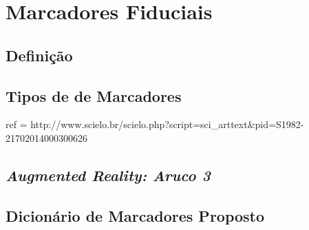 \chapter{Marcadores Fiduciais}

\section{Definição}

\section{Tipos de de Marcadores}

ref = {http://www.scielo.br/scielo.php?script=sci_arttext&pid=S1982-21702014000300626}

\section{\textit{Augmented Reality: Aruco 3}}

\section{Dicionário de Marcadores Proposto}